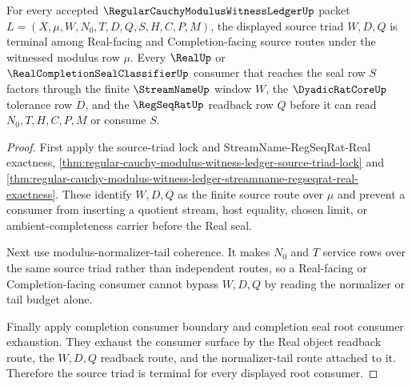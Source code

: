 \begin{theorem}
\label{thm:regular-cauchy-modulus-witness-ledger-source-triad-terminality}
For every accepted $\RegularCauchyModulusWitnessLedgerUp$ packet $L=(X,\mu,W,N_0,T,D,Q,S,H,C,P,M)$, the displayed source triad $W,D,Q$ is terminal among Real-facing and Completion-facing source routes under the witnessed modulus row $\mu$. Every $\RealUp$ or $\RealCompletionSealClassifierUp$ consumer that reaches the seal row $S$ factors through the finite $\StreamNameUp$ window $W$, the $\DyadicRatCoreUp$ tolerance row $D$, and the $\RegSeqRatUp$ readback row $Q$ before it can read $N_0,T,H,C,P,M$ or consume $S$.
\end{theorem}
\begin{proof}
First apply the source-triad lock and StreamName-RegSeqRat-Real exactness, \autoref{thm:regular-cauchy-modulus-witness-ledger-source-triad-lock} and \autoref{thm:regular-cauchy-modulus-witness-ledger-streamname-regseqrat-real-exactness}. These identify $W,D,Q$ as the finite source route over $\mu$ and prevent a consumer from inserting a quotient stream, host equality, chosen limit, or ambient-completeness carrier before the Real seal.

Next use modulus-normalizer-tail coherence. It makes $N_0$ and $T$ service rows over the same source triad rather than independent routes, so a Real-facing or Completion-facing consumer cannot bypass $W,D,Q$ by reading the normalizer or tail budget alone.

Finally apply completion consumer boundary and completion seal root consumer exhaustion. They exhaust the consumer surface by the Real object readback route, the $W,D,Q$ readback route, and the normalizer-tail route attached to it. Therefore the source triad is terminal for every displayed root consumer.
\end{proof}

